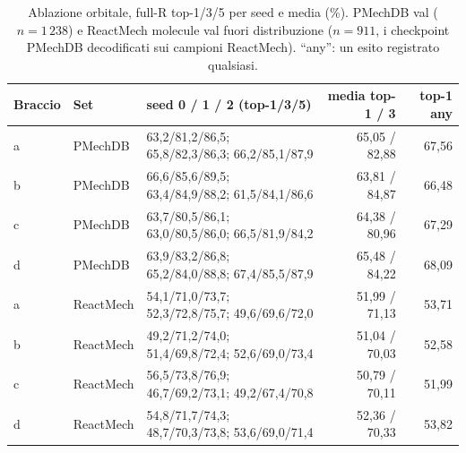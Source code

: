 \documentclass[11pt,a4paper]{report}
\newcommand{\code}[1]{\texttt{\detokenize{#1}}}
\begin{document}
\begin{table}[H]
\centering
\caption{Ablazione orbitale, full-R top-1/3/5 per seed e media (\%). PMechDB \code{closed_base} val
($n=1\,238$) e ReactMech molecule val fuori distribuzione ($n=911$, i checkpoint PMechDB decodificati sui
campioni ReactMech). \enquote{any}: un esito registrato qualsiasi.}
\label{tab:ablazione-orb}
\small
\begin{tabular}{@{}lllrr@{}}
\toprule
Braccio & Set & seed 0 / 1 / 2 (top-1/3/5) & media top-1 / 3 & top-1 any\\
\midrule
a & PMechDB & 63{,}2/81{,}2/86{,}5; 65{,}8/82{,}3/86{,}3; 66{,}2/85{,}1/87{,}9 & 65{,}05 / 82{,}88 & 67{,}56\\
b & PMechDB & 66{,}6/85{,}6/89{,}5; 63{,}4/84{,}9/88{,}2; 61{,}5/84{,}1/86{,}6 & 63{,}81 / 84{,}87 & 66{,}48\\
c & PMechDB & 63{,}7/80{,}5/86{,}1; 63{,}0/80{,}5/86{,}0; 66{,}5/81{,}9/84{,}2 & 64{,}38 / 80{,}96 & 67{,}29\\
d & PMechDB & 63{,}9/83{,}2/86{,}8; 65{,}2/84{,}0/88{,}8; 67{,}4/85{,}5/87{,}9 & 65{,}48 / 84{,}22 & 68{,}09\\
\midrule
a & ReactMech & 54{,}1/71{,}0/73{,}7; 52{,}3/72{,}8/75{,}7; 49{,}6/69{,}6/72{,}0 & 51{,}99 / 71{,}13 & 53{,}71\\
b & ReactMech & 49{,}2/71{,}2/74{,}0; 51{,}4/69{,}8/72{,}4; 52{,}6/69{,}0/73{,}4 & 51{,}04 / 70{,}03 & 52{,}58\\
c & ReactMech & 56{,}5/73{,}8/76{,}9; 46{,}7/69{,}2/73{,}1; 49{,}2/67{,}4/70{,}8 & 50{,}79 / 70{,}11 & 51{,}99\\
d & ReactMech & 54{,}8/71{,}7/74{,}3; 48{,}7/70{,}3/73{,}8; 53{,}6/69{,}0/71{,}4 & 52{,}36 / 70{,}33 & 53{,}82\\
\bottomrule
\end{tabular}
\end{table}
\end{document}
